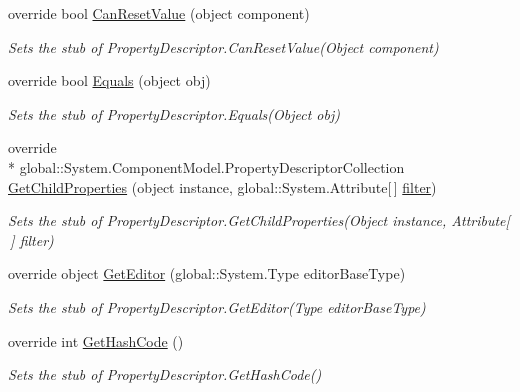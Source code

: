 \begin{DoxyCompactItemize}
override bool \hyperlink{class_system_1_1_component_model_1_1_fakes_1_1_stub_property_descriptor_a72dfcbe9a68da63e99871fa046ef7fab}{Can\-Reset\-Value} (object component)
\begin{DoxyCompactList}\small\item\em Sets the stub of Property\-Descriptor.\-Can\-Reset\-Value(\-Object component)\end{DoxyCompactList}\item 
override bool \hyperlink{class_system_1_1_component_model_1_1_fakes_1_1_stub_property_descriptor_a524b067c774d5d3ca1dfe60d1865d426}{Equals} (object obj)
\begin{DoxyCompactList}\small\item\em Sets the stub of Property\-Descriptor.\-Equals(\-Object obj)\end{DoxyCompactList}\item 
override \\*
global\-::\-System.\-Component\-Model.\-Property\-Descriptor\-Collection \hyperlink{class_system_1_1_component_model_1_1_fakes_1_1_stub_property_descriptor_a119d55f2baa0d4919773341a54fa0688}{Get\-Child\-Properties} (object instance, global\-::\-System.\-Attribute\mbox{[}$\,$\mbox{]} \hyperlink{jquery-1_810_82-vsdoc_8js_ac99d0cf56cab46114f5765a14e03ad6d}{filter})
\begin{DoxyCompactList}\small\item\em Sets the stub of Property\-Descriptor.\-Get\-Child\-Properties(\-Object instance, Attribute\mbox{[}$\,$\mbox{]} filter)\end{DoxyCompactList}\item 
override object \hyperlink{class_system_1_1_component_model_1_1_fakes_1_1_stub_property_descriptor_a843262eb700a027663a668887b528340}{Get\-Editor} (global\-::\-System.\-Type editor\-Base\-Type)
\begin{DoxyCompactList}\small\item\em Sets the stub of Property\-Descriptor.\-Get\-Editor(\-Type editor\-Base\-Type)\end{DoxyCompactList}\item 
override int \hyperlink{class_system_1_1_component_model_1_1_fakes_1_1_stub_property_descriptor_a949610a2ab38a89e75c33b055e05fae7}{Get\-Hash\-Code} ()
\begin{DoxyCompactList}\small\item\em Sets the stub of Property\-Descriptor.\-Get\-Hash\-Code()\end{DoxyCompactList}\item 

\end{DoxyCompactItemize}
